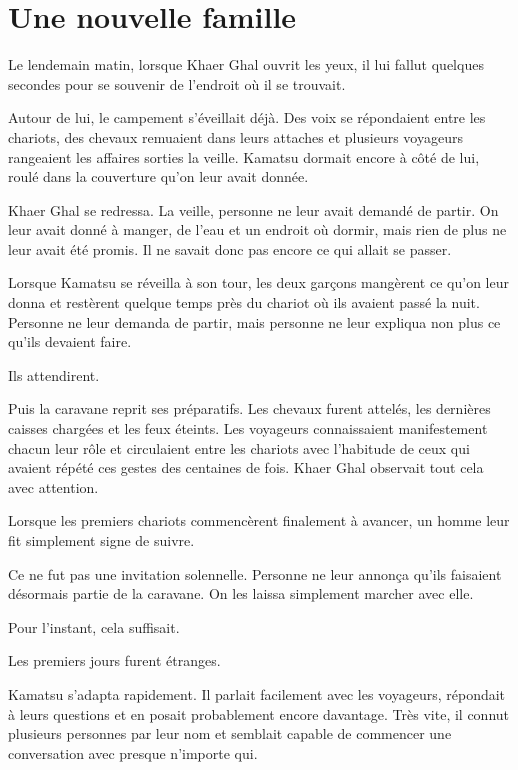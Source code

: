 \chapter{Une nouvelle famille}

Le lendemain matin, lorsque Khaer Ghal ouvrit les yeux, il lui fallut quelques
secondes pour se souvenir de l'endroit où il se trouvait.

Autour de lui, le campement s'éveillait déjà. Des voix se répondaient entre les
chariots, des chevaux remuaient dans leurs attaches et plusieurs voyageurs
rangeaient les affaires sorties la veille. Kamatsu dormait encore à côté de
lui, roulé dans la couverture qu'on leur avait donnée.

Khaer Ghal se redressa. La veille, personne ne leur avait demandé de partir.
On leur avait donné à manger, de l'eau et un endroit où dormir, mais rien de
plus ne leur avait été promis. Il ne savait donc pas encore ce qui allait se
passer.

Lorsque Kamatsu se réveilla à son tour, les deux garçons mangèrent ce qu'on
leur donna et restèrent quelque temps près du chariot où ils avaient passé la
nuit. Personne ne leur demanda de partir, mais personne ne leur expliqua non
plus ce qu'ils devaient faire.

Ils attendirent.

Puis la caravane reprit ses préparatifs. Les chevaux furent attelés, les
dernières caisses chargées et les feux éteints. Les voyageurs connaissaient
manifestement chacun leur rôle et circulaient entre les chariots avec
l'habitude de ceux qui avaient répété ces gestes des centaines de fois. Khaer
Ghal observait tout cela avec attention.

Lorsque les premiers chariots commencèrent finalement à avancer, un homme leur
fit simplement signe de suivre.

Ce ne fut pas une invitation solennelle. Personne ne leur annonça qu'ils
faisaient désormais partie de la caravane. On les laissa simplement marcher
avec elle.

Pour l'instant, cela suffisait.

\scenebreak

Les premiers jours furent étranges.

Kamatsu s'adapta rapidement. Il parlait facilement avec les voyageurs,
répondait à leurs questions et en posait probablement encore davantage. Très
vite, il connut plusieurs personnes par leur nom et semblait capable de
commencer une conversation avec presque n'importe qui.

